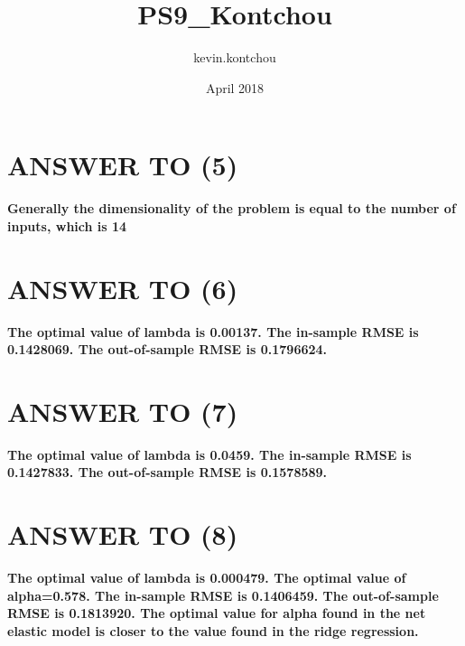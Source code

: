 \documentclass{article}
\title{PS9_Kontchou}
\author{kevin.kontchou }
\date{April 2018}
\begin{document}
\maketitle

\section{ANSWER TO (5)}
\textbf{Generally the dimensionality of the problem is equal to the number of inputs, which is 14}

\section{ANSWER TO (6)}
\textbf{The optimal value of lambda is 0.00137. The in-sample RMSE is 0.1428069. The out-of-sample RMSE is 0.1796624.}

\section{ANSWER TO (7)}
\textbf{The optimal value of lambda is 0.0459. The in-sample RMSE is 0.1427833. The out-of-sample RMSE is 0.1578589.}

\section{ANSWER TO (8)}
\textbf{The optimal value of lambda is 0.000479. The optimal value of alpha=0.578. The in-sample RMSE is 0.1406459. The out-of-sample RMSE is 0.1813920. The optimal value for alpha found in the net elastic model is closer to the value found in the ridge regression.}
\end{document}
